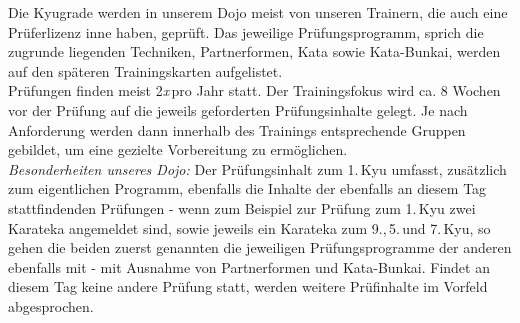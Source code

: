 \begin{center}
{\begin{center}
		\end{center}

		Die Kyugrade werden in unserem Dojo meist von unseren Trainern, die auch eine Prüferlizenz inne haben, geprüft. Das jeweilige Prüfungsprogramm, sprich die zugrunde liegenden Techniken, Partnerformen, Kata sowie Kata-Bunkai, werden auf den späteren Trainingskarten aufgelistet.\\

		Prüfungen finden meist 2\textit{x}\,pro Jahr statt. Der Trainingsfokus wird ca. 8 Wochen vor der Prüfung auf die jeweils geforderten Prüfungsinhalte gelegt. Je nach Anforderung werden dann innerhalb des Trainings entsprechende Gruppen gebildet, um eine gezielte Vorbereitung zu ermöglichen.\\

		\textit{Besonderheiten unseres Dojo:} Der Prüfungsinhalt zum 1.\,Kyu umfasst, zusätzlich zum eigentlichen Programm, ebenfalls die Inhalte der ebenfalls an diesem Tag stattfindenden Prüfungen - wenn zum Beispiel zur Prüfung zum 1.\,Kyu zwei Karateka angemeldet sind, sowie jeweils ein Karateka zum 9.,\,5.\,und 7.\,Kyu, so gehen die beiden zuerst genannten die jeweiligen Prüfungsprogramme der anderen ebenfalls mit - mit Ausnahme von Partnerformen und Kata-Bunkai. Findet an diesem Tag keine andere Prüfung statt, werden weitere Prüfinhalte im Vorfeld abgesprochen.
	}
	\end{center}\null\vfill\null
	\setlength{\tabcolsep}{6pt}
